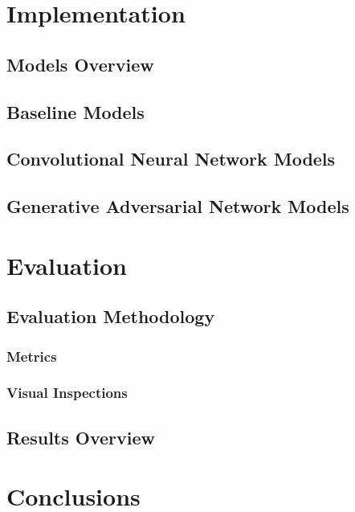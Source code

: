 \documentclass[12pt,a4paper,twoside]{report}
\begin{document}
\chapter{Implementation}
\section{Models Overview}
\section{Baseline Models}
\section{Convolutional Neural Network Models}
\section{Generative Adversarial Network Models}

\chapter{Evaluation}
\section{Evaluation Methodology}
\subsection{Metrics}
\subsection{Visual Inspections}

\section{Results Overview}

\chapter{Conclusions}

\newpage
{}



\end{document}
